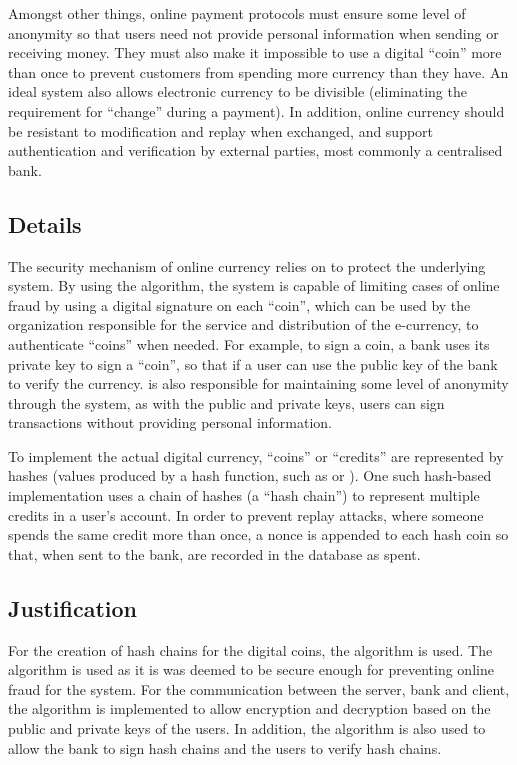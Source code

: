 \documentclass[a4paper,11pt]{article}
\begin{document}
Amongst other things, online payment protocols must ensure some level of
anonymity so that users need not provide personal information when sending or
receiving money. They must also make it impossible to use a digital ``coin''
more than once to prevent customers from spending more currency than they have.
An ideal system also allows electronic currency to be divisible (eliminating the
requirement for ``change'' during a payment). In addition, online currency
should be resistant to modification and replay when exchanged, and support
authentication and verification by external parties, most commonly a centralised
bank.

\subsection{Details}
The security mechanism of online currency relies on  to protect the underlying system. By using the 
algorithm, the system is capable of limiting cases of online fraud by using a
digital signature on each ``coin'', which can be used by the organization
responsible for the service and distribution of the e-currency, to authenticate
``coins'' when needed. For example, to sign a coin, a bank uses its private key
to sign a ``coin'', so that if a user can use the public key of the bank to
verify the currency.  is also responsible for maintaining some
level of anonymity through the system, as with the public and private keys,
users can sign transactions without providing personal information.

To implement the actual digital currency, ``coins'' or ``credits'' are
represented by hashes (values produced by a hash function, such as
 or ). One such hash-based implementation
uses a chain of hashes (a ``hash chain'') to represent multiple credits in a
user's account. In order to prevent replay attacks, where someone spends the
same credit more than once, a nonce is appended to each hash coin so that, when
sent to the bank, are recorded in the database as spent.

\subsection{Justification}
For the creation of hash chains for the digital coins, the 
algorithm is used. The  algorithm is used as it is was deemed to
be secure enough for preventing online fraud for the system. For the
communication between the server, bank and client, the  algorithm
is implemented to allow encryption and decryption based on the public and private
keys of the users. In addition, the  algorithm is also used to
allow the bank to sign hash chains and the users to verify hash chains.
\end{document}
